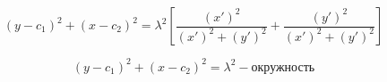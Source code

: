 \documentclass[12pt, a4paper]{report}
\begin{document}
\[ \displaystyle (y- c_1 ) ^2 + (x- c_2 ) ^2 = \lambda ^2 \left[ \frac{(x') ^2 }{(x') ^2 + (y ' ) ^2 } + \frac{(y') ^2 }{(x') ^2 + (y ' ) ^2 } \right]  \] 

\[ \displaystyle (y- c_1 ) ^2 + (x- c_2 ) ^2 = \lambda ^2 - \text{окружность}  \] 





\ifdefined\mainfile
\else
    
\end{document}
